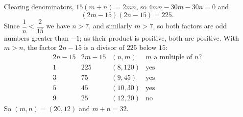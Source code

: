 Clearing denominators, $15(m+n)=2mn$, so $4mn-30m-30n=0$ and
\[
(2m-15)(2n-15)=225 .
\]
Since $\dfrac{1}{n}<\dfrac{2}{15}$ we have $n>7$, and similarly $m>7$, so both factors are odd numbers greater than $-1$; as their product is positive, both are positive. With $m>n$, the factor $2n-15$ is a divisor of $225$ below $15$:
\[
\begin{array}{c|c|c|c}
2n-15 & 2m-15 & (n,m) & m \text{ a multiple of } n?\\ \hline
1 & 225 & (8,120) & \text{yes}\\
3 & 75 & (9,45) & \text{yes}\\
5 & 45 & (10,30) & \text{yes}\\
9 & 25 & (12,20) & \text{no}
\end{array}
\]
So $(m,n)=(20,12)$ and $m+n=\boxed{32}$.
